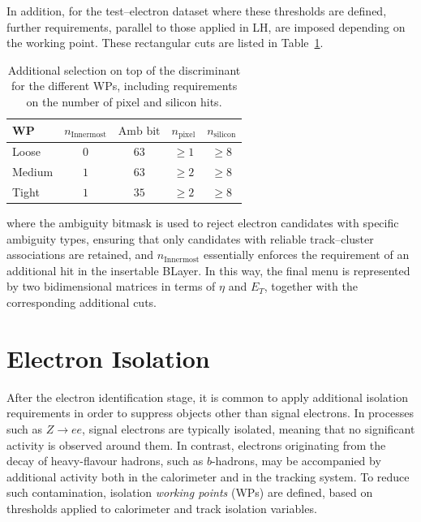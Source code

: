 In addition, for the test–electron dataset where these thresholds are defined, further requirements, parallel to those applied in LH, are imposed depending on the working point. These rectangular cuts are listed in Table~\ref{tab:wp_rectangular_cuts}.

\begin{table}[htbp]
  \centering
  \footnotesize
  \begin{tabular}{lcccc}
  \hline
  WP & $n_{\mathrm{Innermost}}$ & $\text{Amb bit}$ & $n_{\mathrm{pixel}}$ & $n_{\mathrm{silicon}}$ \\
  \hline
  Loose  & 0 & $63$ & $\geq 1$ & $\geq 8$ \\
  Medium & $1$ & $63$ & $\geq 2$ & $\geq 8$ \\
  Tight  & $1$ & $35$ & $\geq 2$ & $\geq 8$ \\
  \hline
  \end{tabular}
  \caption{Additional selection on top of the discriminant for the different WPs, including requirements on the number of pixel and silicon hits.}
  \label{tab:wp_rectangular_cuts}
\end{table}
where the ambiguity bitmask is used to reject electron candidates with specific ambiguity types, ensuring that only candidates with reliable track–cluster associations are retained, and $n_{\mathrm{Innermost}}$ essentially enforces the requirement of an additional hit in the insertable BLayer. In this way, the final menu is represented by two bidimensional matrices in terms of $\eta$ and $E_{T}$, together with the corresponding additional cuts.

\section{Electron Isolation}
\label{electron_iso}

After the electron identification stage, it is common to apply additional isolation requirements in order to suppress objects other than signal electrons. In processes such as $Z \rightarrow ee$, signal electrons are typically isolated, meaning that no significant activity is observed around them. In contrast, electrons originating from the decay of heavy-flavour hadrons, such as $b$-hadrons, may be accompanied by additional activity both in the calorimeter and in the tracking system. To reduce such contamination, isolation \textit{working points} (WPs) are defined, based on thresholds applied to calorimeter and track isolation variables.

